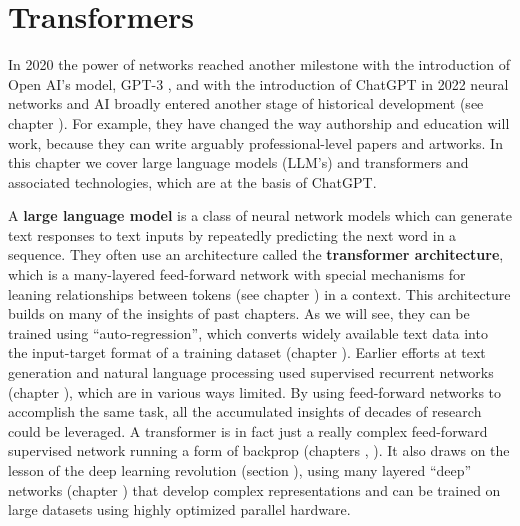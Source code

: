 \chapter{Transformers}\label{ch_transformers}


In 2020 the power of networks reached another milestone with the introduction of Open AI's model, GPT-3 \cite{brown2020language, floridi2020gpt}, and with the introduction of ChatGPT in 2022 neural networks and AI broadly entered another stage of historical development (see chapter ). For example, they have changed the way authorship and education will work, because they can write arguably professional-level papers and artworks. In this chapter we cover large language models (LLM's) and transformers and associated technologies, which are at the basis of ChatGPT.

A \textbf{large language model} is a class of neural network models which can generate text responses to text inputs by repeatedly predicting the next word in a sequence. They often use an architecture called the \textbf{transformer architecture}, which is a many-layered feed-forward network with special mechanisms for leaning relationships between tokens (see chapter ) in a context.  This architecture builds on many of the insights of past chapters. As we will see, they can be trained using ``auto-regression'', which converts widely available text data into the input-target format of a training dataset (chapter ). Earlier efforts at text generation and natural language processing used supervised recurrent networks (chapter ), which are in various ways limited. By using feed-forward networks to accomplish the same task, all the accumulated insights of decades of research could be leveraged. A transformer is in fact just a really complex feed-forward supervised network running a form of backprop (chapters , ). It also draws on the lesson of the deep learning revolution (section ), using many layered ``deep'' networks (chapter ) that develop complex representations and can be trained on large datasets using highly optimized parallel hardware.

